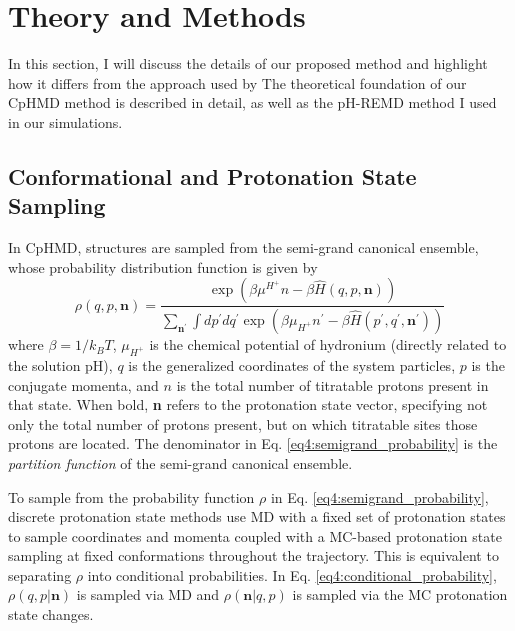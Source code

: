 \section{Theory and Methods}

In this section, I will discuss the details of our proposed method and
highlight how it differs from the approach used by
\citeauthor{Baptista_JChemPhys_2002_v117_p4184}
\cite{Baptista_JChemPhys_2002_v117_p4184} The theoretical foundation of
our CpHMD method is described in detail, as well as the pH-REMD method I used
in our simulations.

\subsection{Conformational and Protonation State Sampling}

In CpHMD, structures are sampled from the semi-grand canonical ensemble, whose
probability distribution function is given by
\begin{equation}
  \rho (q, p, \textbf{n}) =  \frac {\exp \left (\beta \mu ^ {H^+} n - \beta \hat
        H (q, p, \textbf{n}) \right )} {\sum_{\textbf{n$^\prime$}} \int
        dp^\prime dq^\prime \exp \left ( \beta \mu _ {H^+} n^\prime - \beta \hat
        H (p^\prime, q^\prime, \textbf{n$^\prime$}) \right )}
   \label{eq4:semigrand_probability}
\end{equation}
where $\beta = 1 / k_B T$, $\mu _ {H^+}$ is the chemical potential of hydronium
(directly related to the solution pH), $q$ is the generalized coordinates of the
system particles, $p$ is the conjugate momenta, and $n$ is the total number of
titratable protons present in that state. When bold, \textbf{n} refers to the
protonation state vector, specifying not only the total number of protons
present, but on which titratable sites those protons are located. The
denominator in Eq. \ref{eq4:semigrand_probability} is the \emph{partition
function} of the semi-grand canonical ensemble.

To sample from the probability function $\rho$ in Eq.
\ref{eq4:semigrand_probability}, discrete protonation state methods use MD with a
fixed set of protonation states to sample coordinates and momenta coupled with a
MC-based protonation state sampling at fixed conformations throughout the
trajectory. This is equivalent to separating $\rho$ into conditional
probabilities. In Eq. \ref{eq4:conditional_probability}, $\rho(q, p |
\textbf{n})$ is sampled via MD and $\rho(\textbf{n} | q, p)$ is sampled via the
MC protonation state changes.


